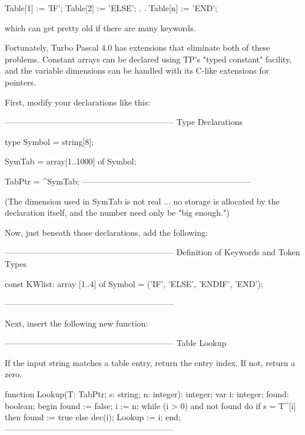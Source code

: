 \documentclass[float=false, crop=false]{standalone}
\begin{document}
     Table[1] := 'IF';
     Table[2] := 'ELSE';
     .
     .
     Table[n] := 'END';

which can get pretty old if there are many keywords.

Fortunately, Turbo Pascal 4.0 has extensions that eliminate both of these
problems. Constant arrays can be declared using TP's "typed constant" facility,
and the variable dimensions can be handled with its C-like extensions for
pointers.

First, modify your declarations like this:

\begin{code}
{--------------------------------------------------------------}
{ Type Declarations  }

type Symbol = string[8];

     SymTab = array[1..1000] of Symbol;

     TabPtr = ^SymTab;
{--------------------------------------------------------------}
\end{code}

(The dimension used in SymTab is not real ... no storage is allocated by the
declaration itself, and the number need only be "big enough.")

Now, just beneath those declarations, add the following:

\begin{code}
{--------------------------------------------------------------}
{ Definition of Keywords and Token Types }

const KWlist: array [1..4] of Symbol =
              ('IF', 'ELSE', 'ENDIF', 'END');

{--------------------------------------------------------------}
\end{code}

Next, insert the following new function:

\begin{code}
{--------------------------------------------------------------}
{ Table Lookup }

{ If the input string matches a table entry, return the entry
  index.  If not, return a zero.  }

function Lookup(T: TabPtr; s: string; n: integer): integer;
var i: integer;
    found: boolean;
begin
   found := false;
   i := n;
   while (i > 0) and not found do
      if s = T^[i] then
         found := true
      else
         dec(i);
   Lookup := i;
end;
{--------------------------------------------------------------}
\end{code}
\end{document}
